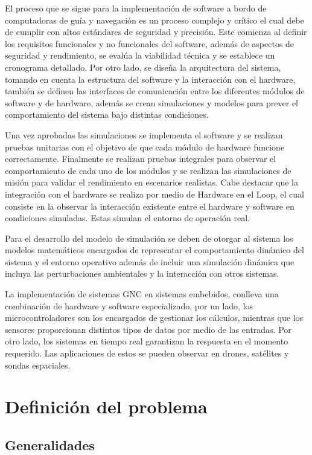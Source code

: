 \documentclass[12pt]{article}
\begin{document}
El proceso que se sigue para la implementación de software a bordo de computadoras de guía y navegación es un proceso complejo y crítico el cual debe de cumplir con altos estándares de seguridad y precisión. Este comienza al definir los requisitos funcionales y no funcionales del software, además de aspectos de seguridad y rendimiento, se evalúa la viabilidad técnica y se establece un cronograma detallado. Por otro lado, se diseña la arquitectura del sistema, tomando en cuenta la estructura del software y la interacción con el hardware, también se definen las interfaces de comunicación entre los diferentes módulos de software y de hardware, además se crean simulaciones y modelos para prever el comportamiento del sistema bajo distintas condiciones. 

Una vez aprobadas las simulaciones se implementa el software y se realizan pruebas unitarias con el objetivo de que cada módulo de hardware funcione correctamente. Finalmente se realizan pruebas integrales para observar el comportamiento de cada uno de los módulos y se realizan las simulaciones de misión para validar el rendimiento en escenarios realistas. Cabe destacar que la integración con el hardware se realiza por medio de Hardware en el Loop, el cual consiste en la observar la interacción existente entre el hardware y software en condiciones simuladas. Estas simulan el entorno de operación real. 

Para el desarrollo del modelo de simulación se deben de otorgar al sistema los modelos matemáticos encargados de representar el comportamiento dinámico del sistema y el entorno operativo además de incluir una simulación dinámica que incluya las perturbaciones ambientales y la interacción con otros sistemas.

La implementación de sistemas GNC en sistemas embebidos, conlleva una combinación de hardware y software especializado, por un lado, los microcontroladores son los encargados de gestionar los cálculos, mientras que los sensores proporcionan distintos tipos de datos por medio de las entradas. Por otro lado, los sistemas en tiempo real garantizan la respuesta en el momento requerido. Las aplicaciones de estos se pueden observar en drones, satélites y sondas espaciales.

\newpage

\section{Definición del problema}

\subsection{Generalidades}
\end{document}
